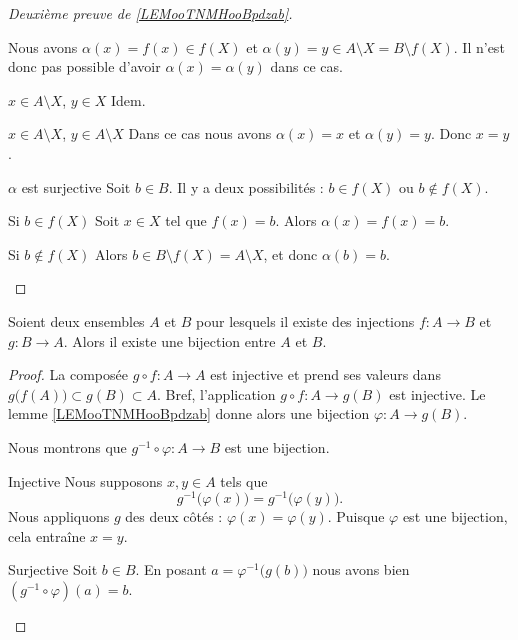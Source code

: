 \begin{proof}[Deuxième preuve de \ref{LEMooTNMHooBpdzab}\cite{BIBooZFPUooIiywbk}]
\begin{subproof}
\begin{subproof}
                Nous avons \( \alpha(x)=f(x)\in f(X)\) et \( \alpha(y)=y\in A\setminus X=B\setminus f(X)\). Il n'est donc pas possible d'avoir \( \alpha(x)=\alpha(y)\) dans ce cas.
            \item[\( x\in A\setminus X\), \( y\in X\)]
                Idem.
            \item[\( x\in A\setminus X\), \( y\in A\setminus X\)]
                Dans ce cas nous avons \( \alpha(x)=x\) et \( \alpha(y)=y\). Donc \( x=y\).
            \end{subproof}
        \item[\( \alpha\) est surjective]
            Soit \( b\in B\). Il y a deux possibilités : \( b\in f(X)\) ou \( b\notin f(X)\).
            \begin{subproof}
            \item[Si \( b\in f(X)\)]
                Soit \( x\in X\) tel que \( f(x)=b\). Alors \( \alpha(x)=f(x)=b\).
            \item[Si \( b\notin f(X)\)]
                Alors \( b\in B\setminus f(X)=A\setminus X\), et donc \( \alpha(b)=b\).
            \end{subproof}
    \end{subproof}
\end{proof}


\begin{theorem}      \label{THOooRYZJooQcjlcl}
    Soient deux ensembles \( A\) et \( B\) pour lesquels il existe des injections \( f\colon A\to B\) et \( g\colon B\to A\). Alors il existe une bijection entre \( A\) et \( B\).
\end{theorem}

\begin{proof}
    La composée \( g\circ f\colon A\to A\) est injective et prend ses valeurs dans \( g\big( f(A) \big)\subset g(B)\subset A\). Bref, l'application \( g\circ f\colon A \to g(B)\) est injective. Le lemme \ref{LEMooTNMHooBpdzab} donne alors une bijection \( \varphi\colon A\to g(B)\).

    Nous montrons que \( g^{-1}\circ\varphi\colon A\to B\) est une bijection.

    \begin{subproof}
        \item[Injective]
            Nous supposons \( x,y\in A\) tels que
            \begin{equation}
                g^{-1}\big( \varphi(x) \big)=g^{-1}\big( \varphi(y) \big).
            \end{equation}
            Nous appliquons \( g\) des deux côtés : \( \varphi(x)=\varphi(y)\). Puisque \( \varphi\) est une bijection, cela entraîne \( x=y\).
        \item[Surjective]
            Soit \( b\in B\). En posant \( a=\varphi^{-1}\big( g(b) \big)\) nous avons bien \( (g^{-1}\circ \varphi)(a)=b\).
    \end{subproof}
\end{proof}

